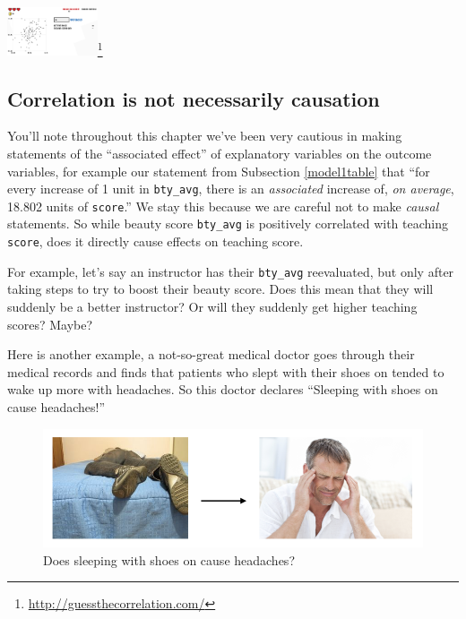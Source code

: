 \documentclass[12pt,]{krantz}
\renewcommand{\href}[2]{#2\footnote{\url{#1}}}
\theoremstyle{definition}
\theoremstyle{definition}
\theoremstyle{definition}
\theoremstyle{remark}
\begin{document}
\begin{center}
\href{http://guessthecorrelation.com/}{\includegraphics[width=0.2\textwidth]{images/guess_the_correlation.png}}
\end{center}

\subsection{Correlation is not necessarily
causation}\label{correlation-is-not-causation}

You'll note throughout this chapter we've been very cautious in making
statements of the ``associated effect'' of explanatory variables on the
outcome variables, for example our statement from Subsection
\ref{model1table} that ``for every increase of 1 unit in
\texttt{bty\_avg}, there is an \emph{associated} increase of, \emph{on
average}, 18.802 units of \texttt{score}.'' We stay this because we are
careful not to make \emph{causal} statements. So while beauty score
\texttt{bty\_avg} is positively correlated with teaching \texttt{score},
does it directly cause effects on teaching score.

For example, let's say an instructor has their \texttt{bty\_avg}
reevaluated, but only after taking steps to try to boost their beauty
score. Does this mean that they will suddenly be a better instructor? Or
will they suddenly get higher teaching scores? Maybe?

Here is another example, a not-so-great medical doctor goes through
their medical records and finds that patients who slept with their shoes
on tended to wake up more with headaches. So this doctor declares
``Sleeping with shoes on cause headaches!''

\begin{figure}

{\centering \includegraphics[width=\textwidth]{images/flowcharts/flowchart.010-cropped} 

}

\caption{Does sleeping with shoes on cause headaches?}\label{fig:moderndive-figure-causal-graph-2}
\end{figure}
\end{document}
